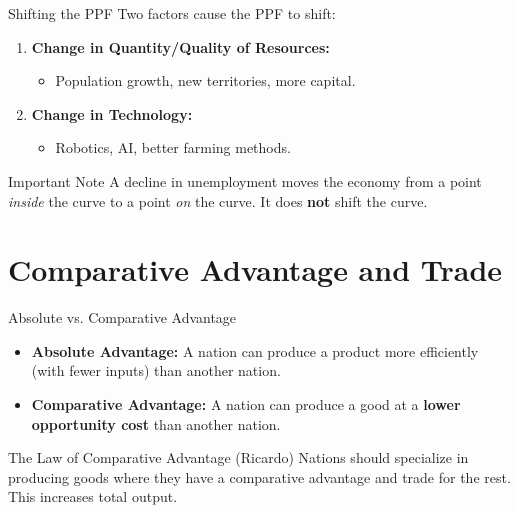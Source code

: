 \documentclass{beamer}
\begin{document}
\begin{frame}{Shifting the PPF}
    Two factors cause the PPF to shift:
    \begin{enumerate}
        \item \textbf{Change in Quantity/Quality of Resources:} 
        \begin{itemize}
            \item Population growth, new territories, more capital.
        \end{itemize}
        \item \textbf{Change in Technology:} 
        \begin{itemize}
            \item Robotics, AI, better farming methods.
        \end{itemize}
    \end{enumerate}
    
    \begin{alertblock}{Important Note}
        A decline in unemployment moves the economy from a point \textit{inside} the curve to a point \textit{on} the curve. It does \textbf{not} shift the curve.
    \end{alertblock}
\end{frame}

\section{Comparative Advantage and Trade}

\begin{frame}{Absolute vs. Comparative Advantage}
    \begin{itemize}
        \item \textbf{Absolute Advantage:} A nation can produce a product more efficiently (with fewer inputs) than another nation.
        \item \textbf{Comparative Advantage:} A nation can produce a good at a \textbf{lower opportunity cost} than another nation.
    \end{itemize}
    
    \begin{block}{The Law of Comparative Advantage (Ricardo)}
        Nations should specialize in producing goods where they have a comparative advantage and trade for the rest. This increases total output.
    \end{block}
\end{frame}
\end{document}
